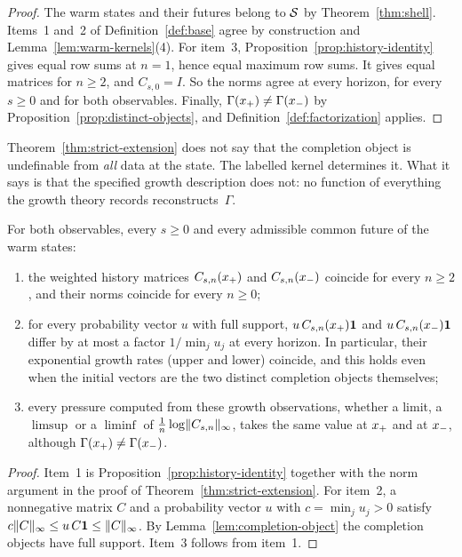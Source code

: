 \begin{proof}
The warm states and their futures belong to $\mathcal{S}$ by Theorem~\ref{thm:shell}. Items~1 and~2 of Definition~\ref{def:base} agree by construction and Lemma~\ref{lem:warm-kernels}(4). For item~3, Proposition~\ref{prop:history-identity} gives equal row sums at $n=1$, hence equal maximum row sums. It gives equal matrices for $n\ge2$, and $C_{s,0}=I$. So the norms agree at every horizon, for every $s\ge0$ and for both observables. Finally, $\Gamma(x_{+})\ne\Gamma(x_{-})$ by Proposition~\ref{prop:distinct-objects}, and Definition~\ref{def:factorization} applies.
\end{proof}

Theorem~\ref{thm:strict-extension} does not say that the completion object is undefinable from \emph{all} data at the state. The labelled kernel determines it. What it says is that the specified growth description does not: no function of everything the growth theory records reconstructs~$\Gamma$.

\begin{theorem}\label{thm:blindness}
For both observables, every $s\ge0$ and every admissible common future of the warm states:
\begin{enumerate}
  \item the weighted history matrices $C_{s,n}(x_{+})$ and $C_{s,n}(x_{-})$ coincide for every $n\ge2$, and their norms coincide for every $n\ge0$;
  \item for every probability vector $u$ with full support, $u\,C_{s,n}(x_{+})\mathbf{1}$ and $u\,C_{s,n}(x_{-})\mathbf{1}$ differ by at most a factor $1/\min_ju_j$ at every horizon. In particular, their exponential growth rates (upper and lower) coincide, and this holds even when the initial vectors are the two distinct completion objects themselves;
  \item every pressure computed from these growth observations, whether a limit, a $\limsup$ or a $\liminf$ of $\frac1n\log\lVert C_{s,n}\rVert_{\infty}$, takes the same value at $x_{+}$ and at $x_{-}$, although $\Gamma(x_{+})\ne\Gamma(x_{-})$.
\end{enumerate}
\end{theorem}

\begin{proof}
Item~1 is Proposition~\ref{prop:history-identity} together with the norm argument in the proof of Theorem~\ref{thm:strict-extension}. For item~2, a nonnegative matrix $C$ and a probability vector $u$ with $c=\min_ju_j>0$ satisfy $c\lVert C\rVert_{\infty}\le u\,C\mathbf{1}\le\lVert C\rVert_{\infty}$. By Lemma~\ref{lem:completion-object} the completion objects have full support. Item~3 follows from item~1.
\end{proof}

